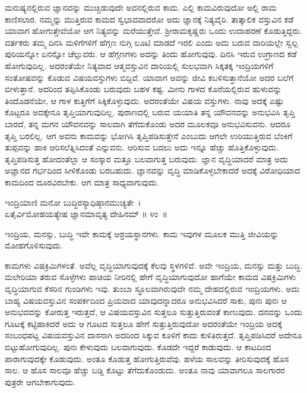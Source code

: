 ಮನುಷ್ಯನಲ್ಲಿರುವ ಜ್ಞಾನವನ್ನು ಮುಚ್ಚಿಡುವುದೇ ಅವನಲ್ಲಿರುವ ಕಾಮ. ಎಲ್ಲಿ ಕಾಮವಿರು\-ವುದೋ ಅಲ್ಲಿ ರಾಮ ಕಾಣಿಸಲಾರ. ನಮ್ಮನ್ನು ಮುತ್ತಿರುವ ಕಾಮದ ಸ್ವಭಾವವಾದರೋ ಅದು ಜ್ಞಾನಕ್ಕೆ ನಿತ್ಯವೈರಿ. ತಾತ್ಕಾಲಿಕ ವಸ್ತುವಿನ ಕಡೆ ಯಾವಾಗ ಹೋಗುತ್ತೇವೆಯೋ ಆಗ ನಿತ್ಯವನ್ನು ಮರೆಯುತ್ತೇವೆ. ಶ‍್ರೀರಾಮಕೃಷ್ಣರು ಒಂದು ಉದಾಹರಣೆ ಕೊಡುತ್ತಿದ್ದರು. ವರ್ತಕರು ತಮ್ಮ ದಿನಸಿ ಮಳಿಗೆಗಳಿಗೆ ಹೆಗ್ಗಣ ನುಗ್ಗಿ ಲೂಟಿ ಮಾಡದೆ ಇರಲಿ ಎಂದು ಅದು ಬರುವ ದಾರಿಯಲ್ಲೇ ಸ್ವಲ್ಪ ಪುರಿಯನ್ನೋ ಏನನ್ನೋ ಚೆಲ್ಲುವರು. ಆ ಹೆಗ್ಗಣಗಳು ಅದನ್ನು ತಿಂದು ಹೋಗುವುವು. ದಿನಸಿ ಇರುವ ಉಗ್ರಾಣದ ಕಡೆ ಹೋಗುವುದಿಲ್ಲ. ಅದರಂತೆಯೇ ನಿತ್ಯವಾದ ಆತ್ಮವಸ್ತುವಿನ ದಾರಿಯಲ್ಲಿ ಸುಲಭವಾಗಿ ಸಿಕ್ಕತಕ್ಕ ಇಂದ್ರಿಯಗಳಿಗೆ ಸಂತೋಷವನ್ನು ಕೊಡುವ ವಿಷಯವಸ್ತುಗಳು ಬಿದ್ದಿವೆ. ಯಾವಾಗ ಅವನ್ನು ಜೀವಿ ಕಬಳಿಸುತ್ತಾನೆಯೋ ಅದರ ಬಲೆಗೆ ಬೀಳುತ್ತಾನೆ. ಅದರಿಂದ ತಪ್ಪಿಸಿಕೊಂಡು ಬರುವುದು ಬಹಳ ಕಷ್ಟ. ಮೀನು ಗಾಳದ ಕೊನೆಯಲ್ಲಿರುವ ಹುಳುವನ್ನು ತಿಂದೊಡನೆಯೇ, ಆ ಗಾಳ ಕುತ್ತಿಗೆಗೆ ಸಿಕ್ಕಿಕೊಳ್ಳುವುದು. ಅದರಂತೆಯೇ ವಿಷಯ ವಸ್ತುಗಳು. ನಾವು ಅದಕ್ಕೆ ಎಷ್ಟು ಕೊಟ್ಟರೂ ಅದಕ್ಕೇನೂ ತೃಪ್ತಿಯಾಗುವುದಿಲ್ಲ. ಪುರಾಣದಲ್ಲಿ ಬರುವ ಯಯಾತಿ ತನ್ನ ಯೌವನವನ್ನು ಅನುಭವಿಸಿ ತೃಪ್ತಿ ಬಾರದೆ, ತನ್ನ ಮಗನ ಯೌವನವನ್ನು ಸಾಲವಾಗಿ ತೆಗೆದುಕೊಂಡು ಅದರ ಮೂಲಕವೂ ಅನುಭವಿಸುವನು. ಆದರೂ ತೃಪ್ತಿ ಬರಲಿಲ್ಲ. ಆಗ ಅವನು ಕಾಮವನ್ನು ಭೋಗಿಸಿ ತೃಪ್ತಿಪಡಿಸುತ್ತೇನೆ ಎಂಬುದು ಆಗಲೇ ಉರಿಯುತ್ತಿರುವ ಬೆಂಕಿಗೆ ತುಪ್ಪವನ್ನು ಹಾಕಿ ಆರಿಸಲೆತ್ನಿಸಿದಂತೆ ಎನ್ನುವನು. ಆರಿಸುವ ಬದಲು ಅದು ಇನ್ನೂ ಹೆಚ್ಚು ಹೊತ್ತಿಕೊಳ್ಳುವುದು. ತೃಪ್ತಿಪಡಿಸುತ್ತ ಹೋದಂತೆಲ್ಲಾ ಆ ಸಂಸ್ಕಾರ ಮತ್ತೂ ಬಲವಾಗುತ್ತ ಬರುವುದು. ಜ್ಞಾನ ವೃದ್ಧಿಯಾದರೆ ಮಾತ್ರ ಅದು ಅಜ್ಞಾನದ ಗರ್ಭದಿಂದ ಸೀಳಿಕೊಂಡು ಬರಬಹುದು. ಜ್ಞಾನವನ್ನು ವೃದ್ಧಿ ಮಾಡಿಕೊಳ್ಳಬೇಕಾದರೆ ಅದಕ್ಕೆ ವಿರೋಧಿಯಾದ ಕಾಮದಿಂದ ದೂರವಿರಬೇಕು. ಆಗ ಮಾತ್ರ ಸಾಧ್ಯವಾಗುವುದು.

\begin{shloka}
ಇಂದ್ರಿಯಾಣಿ ಮನೋ ಬುದ್ಧಿರಸ್ಯಾಧಿಷ್ಠಾನಮುಚ್ಯತೇ~।\\ಏತೈರ್ವಿಮೋಹಯತ್ಯೇಷ ಜ್ಞಾನಮಾವೃತ್ಯ ದೇಹಿನಮ್ \hfill॥ ೪ಂ~॥
\end{shloka}

\begin{artha}
ಇಂದ್ರಿಯ, ಮನಸ್ಸು, ಬುದ್ಧಿ ಇವೇ ಕಾಮಕ್ಕೆ ಆಶ್ರಯಸ್ಥಾನಗಳು. ಕಾಮ ಇವುಗಳ ಮೂಲಕ ಮುತ್ತಿ ಜೀವಿಯನ್ನು ಮೋಹಗೊಳಿಸುವುದು.
\end{artha}

ಕಾಮಗಳು ವಿಷಕ್ರಿಮಿಗಳಂತೆ. ಅವೆಲ್ಲ ವೃದ್ಧಿಯಾಗುವುದಕ್ಕೆ ಕೆಲವು ಸ್ಥಳಗಳಿವೆ. ಅವೇ ಇಂದ್ರಿಯ, ಮನಸ್ಸು ಮತ್ತು ಬುದ್ಧಿ. ಮಲೇರಿಯಾ ತರುವ ಸೊಳ್ಳೆಗಳು ಪಾಚಿಯ ನೀರಿನಲ್ಲಿ ಹೇಗೆ ವೃದ್ಧಿಯಾಗುವುದೋ ಹಾಗೆಯೇ ಕಾಮದ ವಿಷಕ್ರಿಮಿಗಳು ವೃದ್ಧಿಯಾಗುವ ಕೆಸರಿನ ಗುಂಡಿಗಳು ಇವು. ತುಂಬಾ ಸ್ಥೂಲವಾಗಿರುವುದೇ ನಮ್ಮ ದೇಹದಲ್ಲಿರುವ ಇಂದ್ರಿಯಗಳು. ಅದು ಬಾಹ್ಯ ವಿಷಯವಸ್ತುವಿನ ಸಂಪರ್ಕದಿಂದ ಪ್ರಿಯವಾದ ಯಾವುದನ್ನಾದರೂ ಅನುಭವಿಸಿದರೆ ಸಾಕು, ಪುನಃ ಪುನಃ ಆ ಅನುಭವವನ್ನು ಕೋರುತ್ತ ಇರುತ್ತದೆ, ಆ ವಿಷಯವಸ್ತುವಿನ ಸುತ್ತಲೂ ಸುತ್ತುತ್ತಿರುವಂತೆ ಕಾಣುವುದು. ದನವನ್ನು ಒಂದು ಗೂಟಕ್ಕೆ ಕಟ್ಟಿಹಾಕಿದರೆ ಅದು ಆ ಗೂಟದ ಸುತ್ತಲೂ ಹೇಗೆ ಸುತ್ತುತ್ತಿರುವುದೋ ಅದರಂತೆಯೇ ಇಂದ್ರಿಯ ಅದಕ್ಕೆ ಸಂಬಂಧಪಟ್ಟ ವಿಷಯವಸ್ತುವಿನ ದಾಸನಾಗಿ ಅದರಿಂದ ಸಿಕ್ಕುವ ಕೂಳಿಗೆ ಕಾದು ಕುಳಿತಿರುತ್ತದೆ. ತೃಪ್ತಿಪಡಿಸಿದರೆ ಅದೇನೂ ಬಿಟ್ಟುಹೋಗುವುದಿಲ್ಲ. ಪುನಃ ಕೇಳುವುದು ಬಲವಾಗುವುದು. ಕೊಡದೇ ಇದ್ದರೆ ಕಾಡುವುದು. ಆ ಕಾಟದಿಂದ ಪಾರಾಗುವುದಕ್ಕೇ ಕೊಡುವುದು. ಅಂತೂ ಕೊಡುತ್ತ ಹೋಗುತ್ತಿರುವೆವು. ಹಳೆಯ ಸಾಲವನ್ನು ತೀರಿಸುವುದಕ್ಕೆ ಹೊಸ ಸಾಲ. ಆ ಹೊಸ ಸಾಲವೂ ಹೆಚ್ಚು ಬಡ್ಡಿ ಕೊಟ್ಟು ತೆಗೆದುಕೊಂಡುದು. ಅಂತೂ ನಾವು ಯಾವಾಗಲೂ ಸಾಲಗಾರರ ಪುತ್ರರೇ ಆಗಬೇಕಾಗುವುದು.


